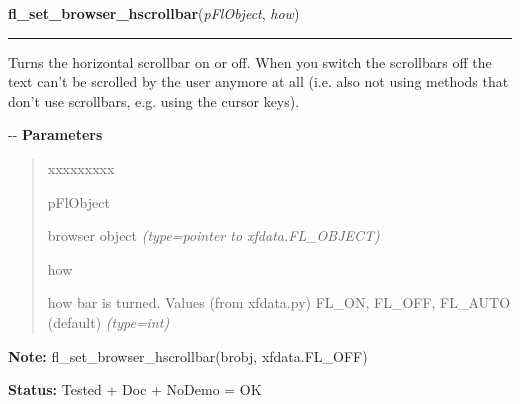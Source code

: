 \hspace{.8\funcindent}\begin{boxedminipage}{\funcwidth}

    \raggedright \textbf{fl\_set\_browser\_hscrollbar}(\textit{pFlObject}, \textit{how})

    \vspace{-1.5ex}

    \rule{\textwidth}{0.5\fboxrule}
\setlength{\parskip}{2ex}

Turns the horizontal scrollbar on or off. When you switch the
scrollbars off the text can't be scrolled by the user anymore at all (i.e.
also not using methods that don't use scrollbars, e.g. using the cursor
keys).

-{}-
\setlength{\parskip}{1ex}
      \textbf{Parameters}
      \vspace{-1ex}

      \begin{quote}
        \begin{Ventry}{xxxxxxxxx}

          \item[pFlObject]


browser object
            {\it (type=pointer to xfdata.FL\_OBJECT)}

          \item[how]


how bar is turned. Values (from xfdata.py) FL\_ON, FL\_OFF, FL\_AUTO
(default)
            {\it (type=int)}

        \end{Ventry}

      \end{quote}

\textbf{Note:} 
fl\_set\_browser\_hscrollbar(brobj, xfdata.FL\_OFF)


\textbf{Status:} 
Tested + Doc + NoDemo = OK


    \end{boxedminipage}

    \label{xformslib:flbrowser:fl_set_browser_line_selectable}

    \vspace{0.5ex}

